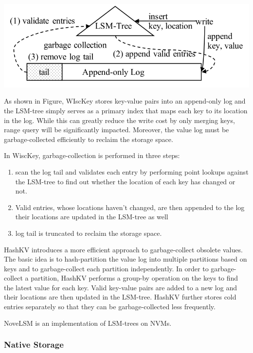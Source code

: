 \documentclass[11pt]{article}
\begin{document}
\begin{center}
\includegraphics[width=.8\textwidth]{../../images/db/13.png}
\end{center}
As shown in Figure, WIscKey stores key-value pairs into an append-only log and the LSM-tree simply
serves as a primary index that maps each key to its location in the log. While this can greatly reduce
the write cost by only merging keys, range query will be significantly impacted. Moreover, the value
log must be garbage-collected efficiently to reclaim the storage space.

In WiscKey, garbage-collection is performed in three steps:
\begin{enumerate}
\item scan the log tail and validates each entry by performing point lookups against the LSM-tree to find
out whether the location of each key has changed or not.
\item Valid entries, whose locations haven't changed, are then appended to the log their locations are
updated in the LSM-tree as well
\item log tail is truncated to reclaim the storage space.
\end{enumerate}

HashKV introduces a more efficient approach to garbage-collect obsolete values. The basic idea is to
hash-partition the value log into multiple partitions based on keys and to garbage-collect each
partition independently. In order to garbage-collect a partition, HashKV performs a group-by operation
on the keys to find the latest value for each key. Valid key-value pairs are added to a new log and
their locations are then updated in the LSM-tree. HashKV further stores cold entries separately so
that they can be garbage-collected less frequently.

NoveLSM is an implementation of LSM-trees on NVMs.
\subsubsection{Native Storage}
\label{sec:orge59843d}
\end{document}
